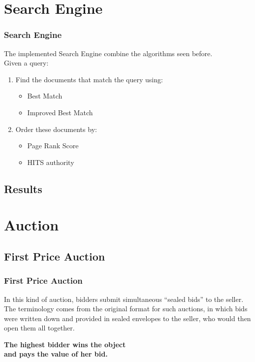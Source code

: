 \documentclass{beamer}
\begin{document}
\section{Search Engine}
\begin{frame}
\frametitle{Search Engine}
The implemented Search Engine combine the algorithms seen before.\\ 
Given a query:
\begin{enumerate}
\item Find the documents that match the query using:
\begin{itemize}
\item Best Match
\item Improved Best Match
\end{itemize}
\item Order these documents by:
\begin{itemize}
\item Page Rank Score
\item HITS authority
\end{itemize}
\end{enumerate}
\end{frame}

\subsection{Results}
\begin{frame}

\end{frame}

\section{Auction}

\subsection{First Price Auction}
\begin{frame}
\frametitle{First Price Auction}
In this kind of auction, bidders submit simultaneous ``sealed bids'' to the seller. The terminology comes from the original format for such auctions, in which bids were written down and provided in sealed envelopes to the seller, who would then open them all together.\\
\medskip
\begin{center}\textbf{The highest bidder wins the object \\ and pays the value of her bid.}\end{center}
\end{frame}
\end{document}

